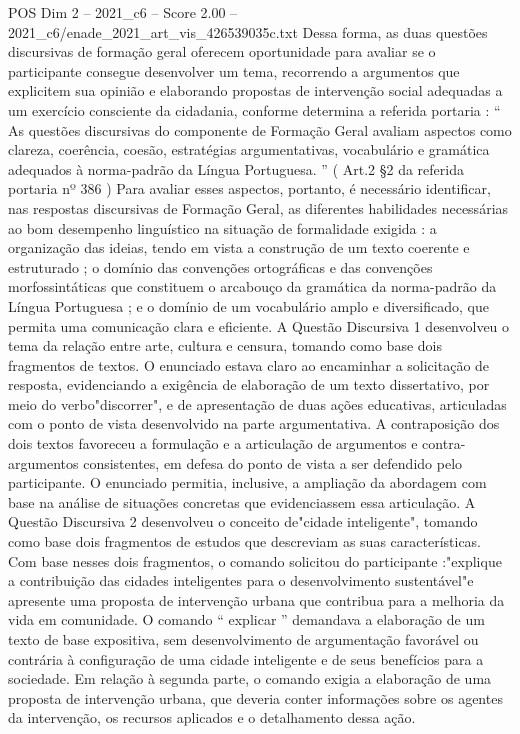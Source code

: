 \begin{textsample}{POS Dim 2 – 2021\_c6 – Score 2.00 – 2021\_c6/enade\_2021\_art\_vis\_426539035c.txt}
Dessa forma, as duas questões discursivas de formação geral oferecem oportunidade para avaliar se o participante consegue desenvolver um tema, recorrendo a argumentos que explicitem sua opinião e elaborando propostas de intervenção social adequadas a um exercício consciente da cidadania, conforme determina a referida portaria : “ As questões discursivas do componente de Formação Geral avaliam aspectos como clareza, coerência, coesão, estratégias argumentativas, vocabulário e gramática adequados à norma-padrão da Língua Portuguesa. ” ( Art.2 §2 da referida portaria nº 386 ) Para avaliar esses aspectos, portanto, é necessário identificar, nas respostas discursivas de Formação Geral, as diferentes habilidades necessárias ao bom desempenho linguístico na situação de formalidade exigida : a organização das ideias, tendo em vista a construção de um texto coerente e estruturado ; o domínio das convenções ortográficas e das convenções morfossintáticas que constituem o arcabouço da gramática da norma-padrão da Língua Portuguesa ; e o domínio de um vocabulário amplo e diversificado, que permita uma comunicação clara e eficiente.
A Questão Discursiva 1 desenvolveu o tema da relação entre arte, cultura e censura, tomando como base dois fragmentos de textos.
O enunciado estava claro ao encaminhar a solicitação de resposta, evidenciando a exigência de elaboração de um texto dissertativo, por meio do verbo"discorrer", e de apresentação de duas ações educativas, articuladas com o ponto de vista desenvolvido na parte argumentativa.
A contraposição dos dois textos favoreceu a formulação e a articulação de argumentos e contra-argumentos consistentes, em defesa do ponto de vista a ser defendido pelo participante.
O enunciado permitia, inclusive, a ampliação da abordagem com base na análise de situações concretas que evidenciassem essa articulação.
A Questão Discursiva 2 desenvolveu o conceito de"cidade inteligente", tomando como base dois fragmentos de estudos que descreviam as suas características.
Com base nesses dois fragmentos, o comando solicitou do participante :"explique a contribuição das cidades inteligentes para o desenvolvimento sustentável"e apresente uma proposta de intervenção urbana que contribua para a melhoria da vida em comunidade.
O comando “ explicar ” demandava a elaboração de um texto de base expositiva, sem desenvolvimento de argumentação favorável ou contrária à configuração de uma cidade inteligente e de seus benefícios para a sociedade.
Em relação à segunda parte, o comando exigia a elaboração de uma proposta de intervenção urbana, que deveria conter informações sobre os agentes da intervenção, os recursos aplicados e o detalhamento dessa ação.

\end{textsample}
